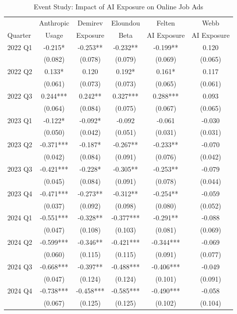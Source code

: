 \documentclass[11pt]{article}
\begin{document}
\begin{table}[H]
\centering
\caption{Event Study: Impact of AI Exposure on Online Job Ads}
\begin{tabular}{lccccc}
\hline\hline
 & Anthropic & Demirev & Eloundou & Felten & Webb \\
Quarter & Usage & Exposure & Beta & AI Exposure & AI Exposure \\
\midrule
2022 Q1 & -0.215* & -0.253** & -0.232** & -0.199** & 0.120 \\
 & (0.082) & (0.078) & (0.079) & (0.069) & (0.065) \\
2022 Q2 & 0.133* & 0.120 & 0.192* & 0.161* & 0.117 \\
 & (0.061) & (0.073) & (0.073) & (0.065) & (0.061) \\
2022 Q3 & 0.244*** & 0.242** & 0.327*** & 0.288*** & 0.093 \\
 & (0.064) & (0.084) & (0.075) & (0.067) & (0.065) \\
2023 Q1 & -0.122* & -0.092* & -0.092 & -0.061 & -0.030 \\
 & (0.050) & (0.042) & (0.051) & (0.031) & (0.031) \\
2023 Q2 & -0.371*** & -0.187* & -0.267** & -0.233** & -0.070 \\
 & (0.042) & (0.084) & (0.091) & (0.076) & (0.042) \\
2023 Q3 & -0.421*** & -0.228* & -0.305** & -0.253** & -0.079 \\
 & (0.045) & (0.084) & (0.091) & (0.078) & (0.044) \\
2023 Q4 & -0.471*** & -0.273** & -0.312** & -0.254** & -0.059 \\
 & (0.037) & (0.092) & (0.098) & (0.080) & (0.052) \\
2024 Q1 & -0.551*** & -0.328** & -0.377*** & -0.291** & -0.088 \\
 & (0.047) & (0.108) & (0.103) & (0.081) & (0.069) \\
2024 Q2 & -0.599*** & -0.346** & -0.421*** & -0.344*** & -0.069 \\
 & (0.060) & (0.115) & (0.115) & (0.091) & (0.077) \\
2024 Q3 & -0.668*** & -0.397** & -0.488*** & -0.406*** & -0.049 \\
 & (0.047) & (0.124) & (0.124) & (0.101) & (0.091) \\
2024 Q4 & -0.738*** & -0.458*** & -0.585*** & -0.490*** & -0.058 \\
 & (0.067) & (0.125) & (0.125) & (0.102) & (0.104) \\

\end{tabular}
\end{table}
\end{document}

